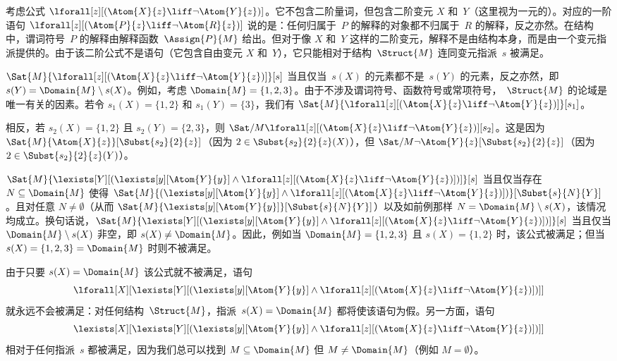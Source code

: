 \documentclass[../../../include/open-logic-section]{subfiles}
\begin{document}
\begin{ex}
  考虑公式 $\lforall[z][(\Atom{X}{z} \liff \lnot
    \Atom{Y}{z})]$。它不包含二阶量词，但包含二阶变元 $X$ 和~$Y$（这里视为一元的）。对应的一阶语句
  $\lforall[z][(\Atom{P}{z} \liff \lnot \Atom{R}{z})]$ 说的是：任何归属于~$P$ 的解释的对象都不归属于~$R$ 的解释，反之亦然。在结构中，谓词符号~$P$ 的解释由解释函数~$\Assign{P}{M}$ 给出。但对于像 $X$ 和~$Y$ 这样的二阶变元，解释不是由结构本身，而是由一个变元指派提供的。由于该二阶公式不是语句（它包含自由变元 $X$ 和~$Y$），它只能相对于结构~$\Struct{M}$ 连同变元指派~$s$ 被满足。

  $\Sat{M}{\lforall[z][(\Atom{X}{z} \liff \lnot \Atom{Y}{z})]}[s]$ 当且仅当~$s(X)$ 的元素都不是~$s(Y)$ 的元素，反之亦然，即 $s(Y) = \Domain{M} \setminus s(X)$。例如，考虑 $\Domain{M} = \{1, 2, 3\}$。由于不涉及谓词符号、函数符号或常项符号，~$\Struct{M}$ 的论域是唯一有关的因素。若令 $s_1(X) = \{1, 2\}$
  和 $s_1(Y) = \{3\}$，我们有 $\Sat{M}{\lforall[z][(\Atom{X}{z}
      \liff \lnot \Atom{Y}{z})]}[s_1]$。

  相反，若 $s_2(X) = \{1, 2\}$ 且 $s_2(Y) = \{2, 3\}$，则 $\Sat/{M}{\lforall[z][(\Atom{X}{z} \liff \lnot
      \Atom{Y}{z})]}[s_2]$。这是因为 $\Sat{M}{\Atom{X}{z}}[\Subst{s_2}{2}{z}]$（因为 $2 \in \Subst{s_2}{2}{z}(X)$），但 $\Sat/{M}{\lnot \Atom{Y}{z}}[\Subst{s_2}{2}{z}]$（因为 $2 \in
  \Subst{s_2}{2}{z}(Y)$）。
\end{ex}

\begin{ex}
  $\Sat{M}{\lexists[Y][(\lexists[y][\Atom{Y}{y}] \land
  \lforall[z][(\Atom{X}{z} \liff \lnot \Atom{Y}{z})])]}[s]$ 当且仅当存在 $N \subseteq \Domain{M}$ 使得 $\Sat{M}{(\lexists[y][\Atom{Y}{y}] \land \lforall[z][(\Atom{X}{z}
  \liff \lnot \Atom{Y}{z})])}[\Subst{s}{N}{Y}]$。且对任意 $N \neq \emptyset$（从而 $\Sat{M}{\lexists[y][\Atom{Y}{y}]}[\Subst{s}{N}{Y}]$）以及如前例那样 $N = \Domain{M} \setminus s(X)$，该情况均成立。换句话说，$\Sat{M}{\lexists[Y][(\lexists[y][\Atom{Y}{y}] \land
  \lforall[z][(\Atom{X}{z} \liff \lnot \Atom{Y}{z})])]}[s]$ 当且仅当 $\Domain{M} \setminus s(X)$ 非空，即 $s(X) \neq \Domain{M}$。因此，例如当 $\Domain{M}
  = \{1, 2, 3\}$ 且 $s(X) = \{1, 2\}$ 时，该公式被满足；但当 $s(X) = \{1, 2, 3\}
  = \Domain{M}$ 时则不被满足。

  由于只要 $s(X) = \Domain{M}$ 该公式就不被满足，语句
  \[
  \lforall[X][\lexists[Y][(\lexists[y][\Atom{Y}{y}] \land
      \lforall[z][(\Atom{X}{z} \liff \lnot \Atom{Y}{z})])]]
  \]
  就永远不会被满足：对任何结构~$\Struct{M}$，指派~$s(X) = \Domain{M}$ 都将使该语句为假。另一方面，语句
  \[
  \lexists[X][\lexists[Y][(\lexists[y][\Atom{Y}{y}] \land
      \lforall[z][(\Atom{X}{z} \liff \lnot \Atom{Y}{z})])]]
  \]
  相对于任何指派~$s$ 都被满足，因为我们总可以找到 $M \subseteq \Domain{M}$ 但 $M \neq \Domain{M}$（例如 $M = \emptyset$）。
\end{ex}
\end{document}
